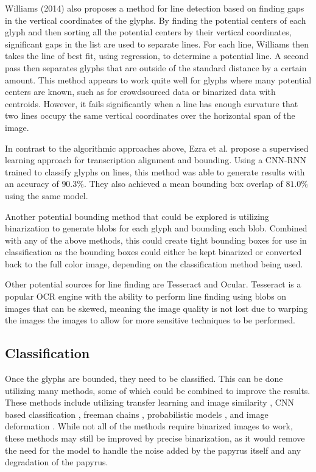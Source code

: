 Williams (2014)\cite{Williams2014} also proposes a method for line detection based on finding gaps in the vertical coordinates of the glyphs. By finding the potential centers of each glyph and then sorting all the potential centers by their vertical coordinates, significant gaps in the list are used to separate lines. For each line, Williams then takes the line of best fit, using regression, to determine a potential line. A second pass then separates glyphs that are outside of the standard distance by a certain amount. This method appears to work quite well for glyphs where many potential centers are known, such as for crowdsourced data or binarized data with centroids. However, it fails significantly when a line has enough curvature that two lines occupy the same vertical coordinates over the horizontal span of the image.

In contrast to the algorithmic approaches above, Ezra et al.\cite{Ezra} propose a supervised learning approach for transcription alignment and bounding. Using a CNN-RNN trained to classify glyphs on lines, this method was able to generate results with an accuracy of $90.3\%$. They also achieved a mean bounding box overlap of $81.0\%$ using the same model.

Another potential bounding method that could be explored is utilizing binarization to generate blobs for each glyph and bounding each blob. Combined with any of the above methods, this could create tight bounding boxes for use in classification as the bounding boxes could either be kept binarized or converted back to the full color image, depending on the classification method being used.

Other potential sources for line finding are Tesseract\cite{SmithTesseract} and Ocular\cite{Berg-Kirkpatrick}. Tesseract is a popular OCR engine with the ability to perform line finding \cite{SmithLines} using blobs on images that can be skewed, meaning the image quality is not lost due to warping the images the images to allow for more sensitive techniques to be performed.

\subsection{Classification}
Once the glyphs are bounded, they need to be classified. This can be done utilizing many methods, some of which could be combined to improve the results.
These methods include utilizing transfer learning and image similarity \cite{Vadicamo, Yuan}, CNN based classification \cite{Yousefi, Haliassos, Swindall}, freeman chains \cite{Althobaiti}, probabilistic models \cite{Berg-Kirkpatrick}, and image deformation \cite{Nederhof, Keysers, Tabin, Gass}. While not all of the methods require binarized images to work, these methods may still be improved by precise binarization, as it would remove the need for the model to handle the noise added by the papyrus itself and any degradation of the papyrus.


